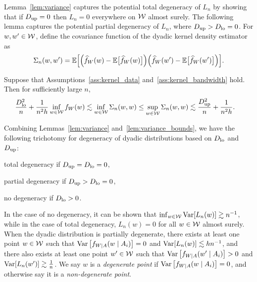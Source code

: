 Lemma~\ref{lem:variance} captures the potential total degeneracy of $L_n$ by
showing that if
$D_{\textup{up}}=0$ then $L_n=0$ everywhere on $\mathcal{W}$ almost surely.
The following lemma
captures the potential partial degeneracy of $L_n$, where
$D_{\textup{up}} > D_{\textup{lo}} = 0$.
For $w,w' \in \mathcal{W}$,
define the covariance function of the dyadic kernel density estimator as
%
\begin{equation*}
  \Sigma_n(w,w')
  =
  \mathbb{E}\Big[
    \Big(
    \widehat f_W(w)
    - \mathbb{E}\big[\widehat f_W(w)\big]
    \Big)
    \Big(
    \widehat f_W(w')
    - \mathbb{E}\big[\widehat f_W(w')\big]
    \Big)
    \Big].
\end{equation*}
%
\begin{lemma}
  \label{lem:variance_bounds}
  Suppose that Assumptions~\ref{ass:kernel_data}
  and~\ref{ass:kernel_bandwidth} hold.
  Then for sufficiently large $n$,
  \begin{align*}
    \frac{D_{\textup{lo}}^2}{n} + \frac{1}{n^2h}
    \inf_{w \in \mathcal{W}} f_W(w)
    &\lesssim
    \inf_{w \in \mathcal{W}} \Sigma_n(w,w)
    \leq
    \sup_{w \in \mathcal{W}} \Sigma_n(w,w)
    \lesssim
    \frac{D_{\textup{up}}^2}{n} + \frac{1}{n^2h}.
  \end{align*}
\end{lemma}

Combining Lemmas~\ref{lem:variance} and~\ref{lem:variance_bounds},
we have the following trichotomy
for degeneracy of dyadic distributions
based on $D_{\textup{lo}}$ and $D_{\textup{up}}$:
%
\begin{inlineroman}
  \item
  total degeneracy if $D_{\textup{up}} = D_{\textup{lo}} = 0$,
  \item
  partial degeneracy if $D_{\textup{up}} > D_{\textup{lo}} = 0$,
  \item
  no degeneracy if $D_{\textup{lo}} > 0$.
\end{inlineroman}
%
In the case of no degeneracy,
it can be shown that
$\inf_{w \in \mathcal{W}} \operatorname{Var}[L_n(w)] \gtrsim n^{-1}$,
while in the case of total degeneracy,
$L_n(w) = 0$ for all $w \in \mathcal{W}$ almost surely.
When the dyadic distribution is partially degenerate,
there exists at least one point
$w\in\mathcal{W}$ such that
$\operatorname{Var}\left[f_{W \mid A}(w \mid A_i)\right] = 0$
and $\operatorname{Var}[L_n(w)]\lesssim h n^{-1}$,
and there also exists at least one point
$w'\in \mathcal{W}$ such that
$\operatorname{Var}\left[f_{W \mid A}(w' \mid A_i)\right] > 0$ and
$\operatorname{Var}[L_n(w')] \gtrsim \frac{1}{n}$.
We say $w$ is a \emph{degenerate point}
if $\operatorname{Var}\left[f_{W \mid A}(w \mid A_i)\right] = 0$,
and otherwise say it is a
\emph{non-degenerate point}.

